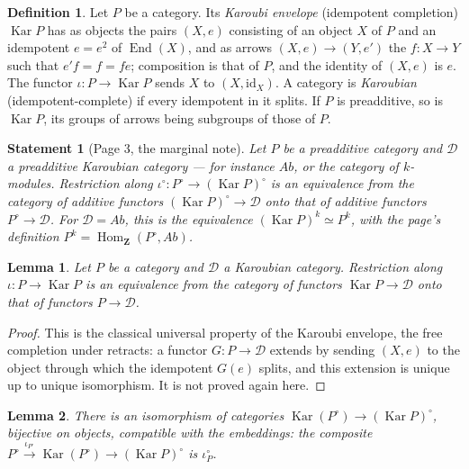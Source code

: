 \documentclass[11pt]{article}
\theoremstyle{plain}
\newtheorem*{enonce}{Statement}
\newtheorem{lemme}{Lemma}[section]
\theoremstyle{definition}
\newtheorem*{definition}{Definition}
\theoremstyle{remark}
\begin{document}
\begin{definition}
Let $P$ be a category. Its \emph{Karoubi envelope} (idempotent completion) $\operatorname{Kar} P$ has as objects the pairs $(X, e)$ consisting of an object $X$ of $P$ and an idempotent $e = e^2$ of $\operatorname{End}(X)$, and as arrows $(X, e) \to (Y, e')$ the $f : X \to Y$ such that $e' f = f = f e$; composition is that of $P$, and the identity of $(X, e)$ is $e$. The functor $\iota : P \to \operatorname{Kar} P$ sends $X$ to $(X, \mathrm{id}_X)$. A category is \emph{Karoubian} (idempotent-complete) if every idempotent in it splits. If $P$ is preadditive, so is $\operatorname{Kar} P$, its groups of arrows being subgroups of those of $P$.
\end{definition}

\begin{enonce}[Page 3, the marginal note]
Let $P$ be a preadditive category and $\mathcal D$ a preadditive Karoubian category --- for instance $Ab$, or the category of $k$-modules. Restriction along $\iota^\circ : P^\circ \to (\operatorname{Kar} P)^\circ$ is an equivalence from the category of additive functors $(\operatorname{Kar} P)^\circ \to \mathcal D$ onto that of additive functors $P^\circ \to \mathcal D$. For $\mathcal D = Ab$, this is the equivalence $(\operatorname{Kar} P)^k \simeq P^k$, with the page's definition $P^k = \operatorname{Hom}_{\mathbf Z}(P^\circ, Ab)$.
\end{enonce}

\begin{lemme}\label{lem:113-univ}
Let $P$ be a category and $\mathcal D$ a Karoubian category. Restriction along $\iota : P \to \operatorname{Kar} P$ is an equivalence from the category of functors $\operatorname{Kar} P \to \mathcal D$ onto that of functors $P \to \mathcal D$.
\end{lemme}

\begin{proof}
This is the classical universal property of the Karoubi envelope, the free completion under retracts: a functor $G : P \to \mathcal D$ extends by sending $(X, e)$ to the object through which the idempotent $G(e)$ splits, and this extension is unique up to unique isomorphism. It is not proved again here.
\end{proof}

\begin{lemme}\label{lem:113-op}
There is an isomorphism of categories $\operatorname{Kar}(P^\circ) \to (\operatorname{Kar} P)^\circ$, bijective on objects, compatible with the embeddings: the composite $P^\circ \xrightarrow{\iota_{P^\circ}} \operatorname{Kar}(P^\circ) \to (\operatorname{Kar} P)^\circ$ is $\iota_P^\circ$.
\end{lemme}
\end{document}
